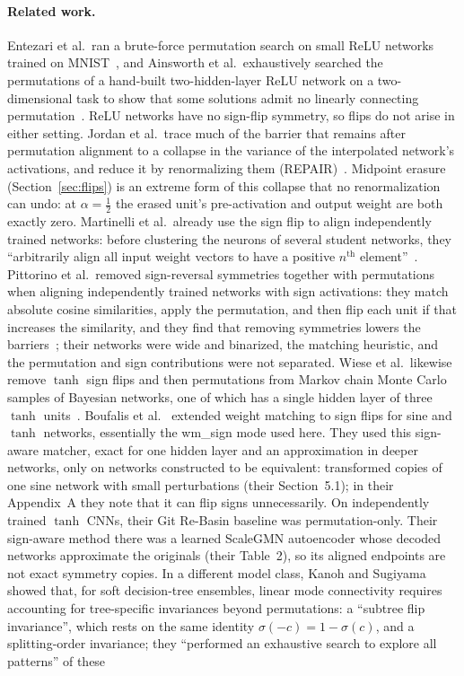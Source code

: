 \documentclass[11pt]{article}
\newcommand{\md}[1]{\textsf{#1}}
\begin{document}
\paragraph{Related work.} Entezari et al.\ ran a brute-force permutation search on small ReLU networks trained on MNIST~\cite[Appendix~E.3]{entezari2022role}, and Ainsworth et al.\ exhaustively searched the permutations of a hand-built two-hidden-layer ReLU network on a two-dimensional task to show that some solutions admit no linearly connecting permutation~\cite[Appendix~A.6]{ainsworth2023git}. ReLU networks have no sign-flip symmetry, so flips do not arise in either setting. Jordan et al.\ trace much of the barrier that remains after permutation alignment to a collapse in the variance of the interpolated network's activations, and reduce it by renormalizing them (REPAIR)~\cite{jordan2023repair}. Midpoint erasure (Section~\ref{sec:flips}) is an extreme form of this collapse that no renormalization can undo: at $\alpha = \tfrac12$ the erased unit's pre-activation and output weight are both exactly zero. Martinelli et al.\ already use the sign flip to align independently trained networks: before clustering the neurons of several student networks, they ``arbitrarily align all input weight vectors to have a positive $n^{\text{th}}$ element''~\cite[Section~5]{martinelli2024expand}. Pittorino et al.\ removed sign-reversal symmetries together with permutations when aligning independently trained networks with sign activations: they match absolute cosine similarities, apply the permutation, and then flip each unit if that increases the similarity, and they find that removing symmetries lowers the barriers~\cite[Section~3.1.2, Section~4.2 and Fig.~19]{pittorino2022deep}; their networks were wide and binarized, the matching heuristic, and the permutation and sign contributions were not separated. Wiese et al.\ likewise remove $\tanh$ sign flips and then permutations from Markov chain Monte Carlo samples of Bayesian networks, one of which has a single hidden layer of three $\tanh$ units~\cite[Section~5.3 and Appendix~B]{wiese2023towards}. Boufalis et al.~\cite[Appendix~A, Proposition~1]{boufalis2025symmetry} extended weight matching to sign flips for sine and $\tanh$ networks, essentially the \md{wm\_sign} mode used here. They used this sign-aware matcher, exact for one hidden layer and an approximation in deeper networks, only on networks constructed to be equivalent: transformed copies of one sine network with small perturbations (their Section~5.1); in their Appendix~A they note that it can flip signs unnecessarily. On independently trained $\tanh$ CNNs, their Git Re-Basin baseline was permutation-only. Their sign-aware method there was a learned ScaleGMN autoencoder whose decoded networks approximate the originals (their Table~2), so its aligned endpoints are not exact symmetry copies. In a different model class, Kanoh and Sugiyama showed that, for soft decision-tree ensembles, linear mode connectivity requires accounting for tree-specific invariances beyond permutations: a ``subtree flip invariance'', which rests on the same identity $\sigma(-c) = 1-\sigma(c)$, and a splitting-order invariance; they ``performed an exhaustive search to explore all patterns'' of these 
\end{document}
